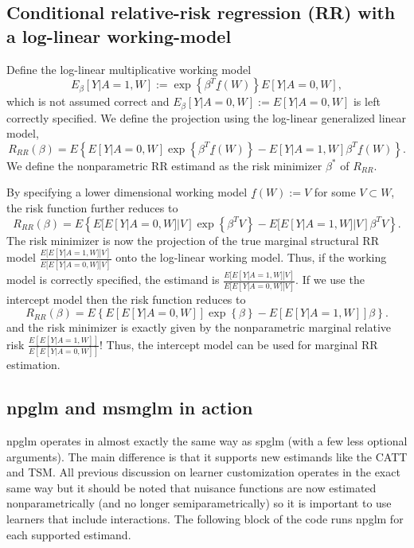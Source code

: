 \documentclass[article]{jss}
\begin{document}
\subsection{Conditional relative-risk regression (RR) with a log-linear working-model}
Define the log-linear multiplicative working model
$$E_{\beta}[Y|A=1,W] := \exp\left\{\beta^T \underline{f}(W) \right\}E[Y|A=0,W],$$
which is not assumed correct and $E_{\beta}[Y|A=0,W] := E[Y|A=0,W]$ is left correctly specified. We define the projection using the log-linear generalized linear model,
$$R_{RR}(\beta) = E \left\{E[Y|A=0,W] \exp\left\{ \beta^T \underline{f}(W)\right\}  -  E[Y|A=1,W]  \beta^T \underline{f}(W)\right\}.$$
We define the nonparametric RR estimand as the risk minimizer $\beta^*$ of $R_{RR}$. 

By specifying a lower dimensional working model $\underline{f}(W) := V$ for some $V \subset W$, the risk function further reduces to
$$R_{RR}(\beta) = E \left\{E[E[Y|A=0,W]|V] \exp\left\{ \beta^T V\right\}  -  E[E[Y|A=1,W]|V]  \beta^T V\right\}.$$
The risk minimizer is now the projection of the true marginal structural RR model $\frac{E[E[Y|A=1,W]|V]}{E[E[Y|A=0,W]|V]}$ onto the log-linear working model. Thus, if the working model is correctly specified, the estimand is $\frac{E[E[Y|A=1,W]|V]}{E[E[Y|A=0,W]|V]}$. If we use the intercept model then the risk function reduces to
$$R_{RR}(\beta) = E \left\{E[E[Y|A=0,W]] \exp\left\{ \beta \right\}  -  E[E[Y|A=1,W]]  \beta\right\}.$$
and the risk minimizer is exactly given by the nonparametric marginal relative risk $\frac{E[E[Y|A=1,W]]}{E[E[Y|A=0,W]]}$! Thus, the intercept model can be used for marginal RR estimation.


\subsection{npglm and msmglm in action}
npglm operates in almost exactly the same way as spglm (with a few less optional arguments). The main difference is that it supports new estimands like the CATT and TSM. All previous discussion on learner customization operates in the exact same way but it should be noted that nuisance functions are now estimated nonparametrically (and no longer semiparametrically) so it is important to use learners that include interactions. The following block of the code runs npglm for each supported estimand.
\end{document}
